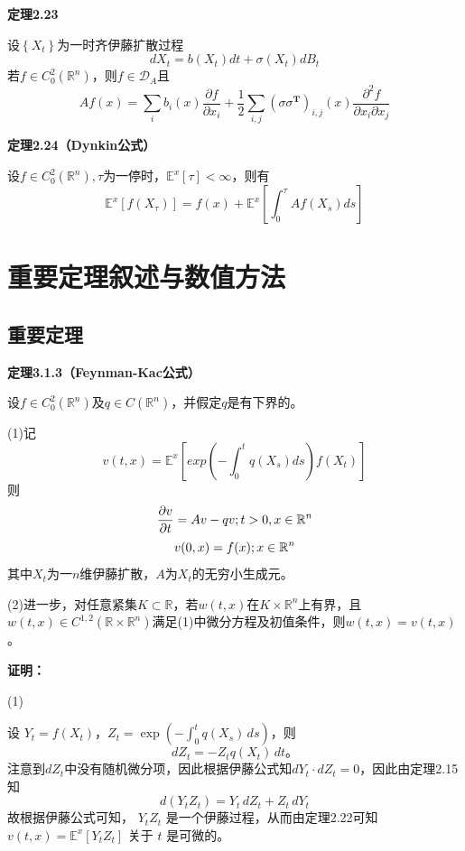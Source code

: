 \documentclass[UTF8，12pt]{ctexart}
\numberwithin{equation}{section}
\begin{document}
\vspace{0.3cm}
\noindent \textbf{定理2.23}

设$\left\{X_t\right\}$为一时齐伊藤扩散过程
\[
dX_t=b(X_t)dt+\sigma(X_t)dB_t
\]
若$f\in C_0^2(\mathbb{R}^n)$，则$f\in\mathcal{D}_A$且
\[
Af(x)=\sum_ib_i(x)\frac{\partial f}{\partial x_i}+\frac{1}{2}\sum_{i,j}(\sigma\sigma^{\mathbf{T}})_{i,j}(x)\frac{\partial^2f}{\partial x_i\partial x_j}
\]

\vspace{0.3cm}
\noindent \textbf{定理2.24（Dynkin公式）}

设$f\in C_0^2(\mathbb{R}^n),\tau$为一停时，$\mathbb{E}^x[\tau]<\infty$，则有
\[
\mathbb{E}^x[f(X_\tau)]=f(x)+\mathbb{E}^x\left[\int_{0}^{\tau}Af(X_s)ds\right]
\]

\section{重要定理叙述与数值方法}
\subsection{重要定理}
\vspace{0.3cm}
\noindent \textbf{定理3.1.3（Feynman-Kac公式）}

设$f\in C_0^2(\mathbb{R}^n)$及$q\in C(\mathbb{R}^n)$，并假定$q$是有下界的。

\noindent(1)记
\[
v(t,x)=\mathbb{E}^x[exp(-\int_{0}^{t}q(X_s)ds)f(X_t)]
\]
则
\[
\frac{\partial v}{\partial t}=Av-qv;\vspace*{0.5cm}t>0,x\in\mathbb{R}^n
\]
\[
v(0,x)=f(x);\vspace*{0.5cm}x\in\mathbb{R}^n
\]
其中$X_t$为一$n$维伊藤扩散，$A$为$X_t$的无穷小生成元。

\noindent(2)进一步，对任意紧集$K\subset\mathbb{R}$，若$w(t,x)$在$K\times\mathbb{R}^n$上有界，且$w(t,x)\in C^{1,2}(\mathbb{R}\times\mathbb{R}^n)$满足(1)中微分方程及初值条件，则$w(t,x)=v(t,x)$。

\noindent\textbf{证明：}

\noindent(1)

设 \( Y_t = f(X_t) \)，\( Z_t = \exp\left( -\int_0^t q(X_s)\, ds \right) \)，则
\[
dZ_t = -Z_t q(X_t)\, dt。
\]
注意到$dZ_t$中没有随机微分项，因此根据伊藤公式知$dY_t\cdot dZ_t=0$，因此由定理2.15知
\[
d(Y_t Z_t) = Y_t\, dZ_t + Z_t\, dY_t
\]
故根据伊藤公式可知， \( Y_t Z_t \) 是一个伊藤过程，从而由定理2.22可知  
\( v(t, x) = \mathbb{E}^x[Y_t Z_t] \) 关于 \( t \) 是可微的。
\end{document}
